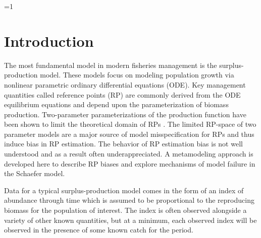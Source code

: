 \documentclass[12pt]{article}
\newcounter{alphasect}
\def\alphainsection{0}
\let\oldsection=\section
\def\section{%
  \ifnum\alphainsection=1%
    \addtocounter{alphasect}{1}
  \fi%
\oldsection}%
\begin{document}
%
%

\clearpage
{\color{gray}
\section{Introduction\label{int}}

%
The most fundamental model in modern fisheries management is the surplus-production 
model. These models focus on modeling population growth via nonlinear 
parametric ordinary differential equations (ODE). Key management quantities 
called reference points (RP) are commonly derived from the ODE equilibrium 
equations and depend upon the parameterization of biomass production. 
Two-parameter parameterizations of the production function have been shown to 
limit the theoretical domain of RPs . The 
limited RP-space of two parameter models are a major source of model 
misspecification for RPs and thus induce bias in RP estimation. The behavior 
of RP estimation bias is not well understood and as a result often 
underappreciated. A metamodeling approach is developed here to describe RP 
biases and explore mechanisms of model failure in the Schaefer model. 

%

Data for a typical surplus-production model comes in the form of an index 
of abundance through time which is assumed to be proportional to the reproducing 
biomass for the population of interest. The index is often observed alongside 
a variety of other known quantities, but at a minimum, each observed index 
will be observed in the presence of some known catch for the period. 

}
\end{document}
